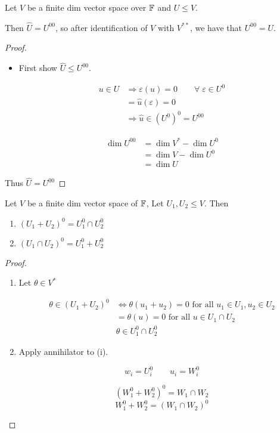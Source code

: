 \documentclass[a4paper]{article}
\begin{document}
\begin{lemma} 
	Let $ V $ be a finite dim vector space over $ \mathbb{F} $ and $ U \leq V $.
	
	Then $ \hat{U} = U^{00} $, so after identification of $ V $ with $ V^{**} $, we have that $ U^{00} = U$.  
\end{lemma}

\begin{proof}
	\begin{itemize}
		\item First show $ \hat{U} \leq U^{00} $.
		
		\begin{align*}
		u \in U & \Rightarrow \varepsilon(u) = 0 \qquad \forall \; \varepsilon \in U^{0} \\
		& = \hat{u}(\varepsilon) = 0 \\
		& \Rightarrow \hat{u} \in (U^{0})^{0} = U^{00}
		\end{align*}
		
		
		\begin{align*}
		\dim U^{00}& = \dim V^{*} - \dim U^{0} \\
		& = \dim V - \dim U^{0} \\
		& = \dim U
		\end{align*}
	\end{itemize}

Thus $ \hat{U} = U^{00} $

\end{proof}

\begin{lemma} 
	Let $ V $ be a finite dim vector space of $ \mathbb{F} $, Let $ U_{1},U_{2} \leq V $. Then
	
	
	\begin{enumerate}
		\item $ (U_{1} + U_{2})^{0} = U_{1}^{0} \cap U_{2}^{0} $
		\item $ (U_{1} \cap U_{2})^{0} = U_{1}^{0} + U_{2}^{0} $
		
	\end{enumerate}
\end{lemma}

\begin{proof}
	\begin{enumerate}
		\item Let $ \theta \in V^{*} $
		
		\begin{align*}
		\theta \in (U_{1} + U_{2})^{0} & \iff \theta(u_{1} + u_{2}) = 0 \text{ for all } u_{1} \in U_{1},u_{2} \in U_{2} \\
		& = \theta(u) = 0 \text{ for all } u \in U_{1} \cap U_{2} \\
		& \theta \in U_{1}^{0} \cap U_{2}^{0}
 		\end{align*}
		
		\item Apply annihilator to (i).
		
		\[ w_{i} = U_{i}^{0} \qquad u_{i} = W_{i}^{0} \]
		
		\[ (W_{1}^{0} + W_{2}^{0} )^{0} = W_{1} \cap W_{2} \]
		\[ W_{1}^{0} + W_{2}^{0} = (W_{1} \cap W_{2} )^{0} \]
		
	\end{enumerate}
\end{proof}
\end{document}
